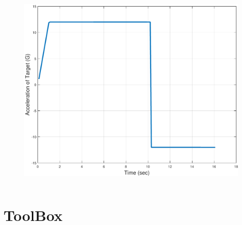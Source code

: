 \documentclass{beamer}
\begin{document}
\begin{frame}
\begin{columns}[c]
	\begin{column}{.3\linewidth}
		\begin{figure}
			\centering
			\includegraphics[scale = 0.18]{fig/TargetAccelerationTrap.pdf}
		\end{figure}
	\end{column}
	
	
\end{columns}

\end{frame}



\section{ToolBox}

\end{document}
